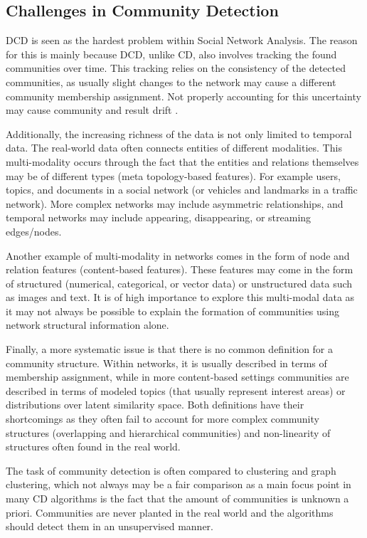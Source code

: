 \documentclass[
acmsmall,
nonacm,
screen,
acmthm]{acmart}
\begin{document}
\hypertarget{challenges-in-community-detection}{%
\subsection{Challenges in Community
Detection}\label{challenges-in-community-detection}}

DCD is seen as the hardest problem within Social Network Analysis. The
reason for this is mainly because DCD, unlike CD, also involves tracking
the found communities over time. This tracking relies on the consistency
of the detected communities, as usually slight changes to the network
may cause a different community membership assignment. Not properly
accounting for this uncertainty may cause community and result drift
\citep{dakicheTrackingCommunityEvolution2019}.

Additionally, the increasing richness of the data is not only limited to
temporal data. The real-world data often connects entities of different
modalities. This multi-modality occurs through the fact that the
entities and relations themselves may be of different types (meta
topology-based features). For example users, topics, and documents in a
social network (or vehicles and landmarks in a traffic network). More
complex networks may include asymmetric relationships, and temporal
networks may include appearing, disappearing, or streaming edges/nodes.

Another example of multi-modality in networks comes in the form of node
and relation features (content-based features). These features may come
in the form of structured (numerical, categorical, or vector data) or
unstructured data such as images and text. It is of high importance to
explore this multi-modal data as it may not always be possible to
explain the formation of communities using network structural
information alone.

Finally, a more systematic issue is that there is no common definition
for a community structure. Within networks, it is usually described in
terms of membership assignment, while in more content-based settings
communities are described in terms of modeled topics (that usually
represent interest areas) or distributions over latent similarity space.
Both definitions have their shortcomings as they often fail to account
for more complex community structures (overlapping and hierarchical
communities) and non-linearity of structures often found in the real
world.

The task of community detection is often compared to clustering and
graph clustering, which not always may be a fair comparison as a main
focus point in many CD algorithms is the fact that the amount of
communities is unknown a priori. Communities are never planted in the
real world and the algorithms should detect them in an unsupervised
manner.
\end{document}

